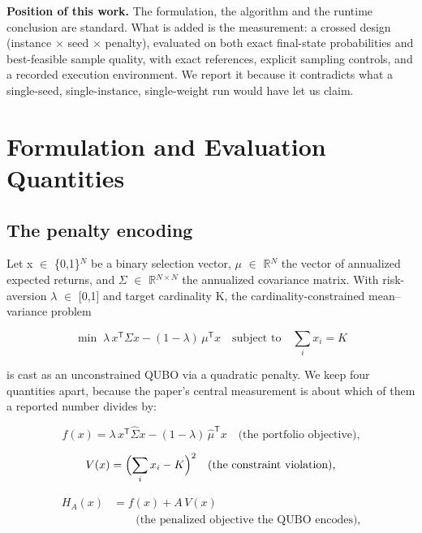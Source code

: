 \documentclass[journal]{IEEEtran}
\begin{document}
\textbf{Position of this work.} The formulation, the algorithm and the runtime conclusion are standard. What is added is the measurement: a crossed design (instance $\times$ seed $\times$ penalty), evaluated on both exact final-state probabilities and best-feasible sample quality, with exact references, explicit sampling controls, and a recorded execution environment. We report it because it contradicts what a single-seed, single-instance, single-weight run would have let us claim.


\section{Formulation and Evaluation Quantities}


\subsection{The penalty encoding}


Let x $\in$ \{0,1\}$^{N}$ be a binary selection vector, $\mu$ $\in$ $\mathbb{R}$$^{N}$ the vector of annualized expected returns, and $\Sigma$ $\in$ $\mathbb{R}$$^{N\times N}$ the annualized covariance matrix. With risk-aversion $\lambda$ $\in$ [0,1] and target cardinality K, the cardinality-constrained mean--variance problem


\begin{equation*}
\min\; \lambda\, x^{\mathsf{T}}\Sigma x - (1-\lambda)\, \mu^{\mathsf{T}}x\quad \text{subject to}\quad \sum_i x_i = K
\end{equation*}


is cast as an unconstrained QUBO via a quadratic penalty. We keep four quantities apart, because the paper's central measurement is about which of them a reported number divides by:


\begin{equation*}
f(x) = \lambda\, x^{\mathsf{T}}\hat{\Sigma} x - (1-\lambda)\, \hat{\mu}^{\mathsf{T}}x\quad\text{(the portfolio objective),}
\end{equation*}


\begin{equation*}
V(x) = \Bigl(\sum_i x_i - K\Bigr)^2\quad\text{(the constraint violation),}
\end{equation*}


\begin{equation*}
\begin{aligned} H_A(x) &= f(x) + A\, V(x) \\ &\qquad\text{(the penalized objective the QUBO encodes),}\end{aligned}
\end{equation*}
\end{document}
